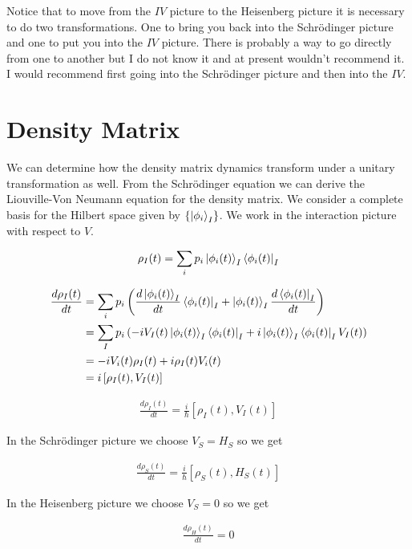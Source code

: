 \documentclass[12pt]{article}
\begin{document}
Notice that to move from the $IV$ picture to the Heisenberg picture it is necessary to do two transformations. One to bring you back into the Schr{\"o}dinger picture and one to put you into the $IV$ picture. There is probably a way to go directly from one to another but I do not know it and at present wouldn't recommend it. I would recommend first going into the Schr{\"o}dinger picture and then into the $IV$.

\section{Density Matrix}

We can determine how the density matrix dynamics transform under a unitary transformation as well. From the Schr{\"o}dinger equation we can derive the Liouville-Von Neumann equation for the density matrix.  We consider a complete basis for the Hilbert space given by $\{\ket{\phi_i}_I\}$. We work in the interaction picture with respect to $V$.

\begin{align}
\rho_I(t) = \sum_i p_i \ket{\phi_i(t)}_I\bra{\phi_i(t)}_I
\end{align}

\begin{align}
\frac{d{\rho}_I(t)}{d t} &= \sum_i p_i \left(\frac{d \ket{\phi_i(t)}_I}{d t} \bra{\phi_i(t)}_I + \ket{\phi_i(t)}_I\frac{d \bra{\phi_i(t)}_I}{d t} \right)\\
&= \sum_I p_i \left(-iV_I(t) \ket{\phi_i(t)}_I\bra{\phi_i(t)}_I + i \ket{\phi_i(t)}_I\bra{\phi_i(t)}_I V_I(t) \right)\\
&= -i V_i(t) \rho_I(t) + i \rho_I(t) V_i(t)\\
&= i \left[\rho_I(t), V_I(t)\right]
\end{align}

\begin{align}
\boxed{\frac{d \rho_I(t)}{d t} = \frac{i}{\hbar} \left[\rho_I(t), V_I(t)\right]}
\end{align}

In the Schr{\"o}dinger picture we choose $V_S=H_S$ so we get

\begin{align}
\boxed{\frac{d \rho_S(t)}{d t} = \frac{i}{\hbar} \left[\rho_S(t), H_S(t)\right]}
\end{align}

In the Heisenberg picture we choose $V_S = 0$ so we get

\begin{align}
\boxed{\frac{d \rho_H(t)}{d t} = 0}
\end{align}
\end{document}
